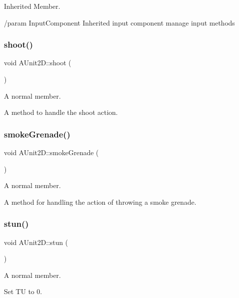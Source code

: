 Inherited Member. 

/param Input\+Component Inherited input component manage input methods \hypertarget{class_a_unit2_d_a6cbf098b221157bb99dc278b3c8dab70}{}\label{class_a_unit2_d_a6cbf098b221157bb99dc278b3c8dab70} 
\subsubsection{\texorpdfstring{shoot()}{shoot()}}
{\footnotesize\ttfamily void A\+Unit2\+D\+::shoot (\begin{DoxyParamCaption}{ }\end{DoxyParamCaption})}



A normal member. 

A method to handle the shoot action. \hypertarget{class_a_unit2_d_ae12beff66c2558df2ca19ae222900988}{}\label{class_a_unit2_d_ae12beff66c2558df2ca19ae222900988} 
\subsubsection{\texorpdfstring{smoke\+Grenade()}{smokeGrenade()}}
{\footnotesize\ttfamily void A\+Unit2\+D\+::smoke\+Grenade (\begin{DoxyParamCaption}{ }\end{DoxyParamCaption})}



A normal member. 

A method for handling the action of throwing a smoke grenade. \hypertarget{class_a_unit2_d_aa98e4af27fd175f81fc9761e4b139caf}{}\label{class_a_unit2_d_aa98e4af27fd175f81fc9761e4b139caf} 
\subsubsection{\texorpdfstring{stun()}{stun()}}
{\footnotesize\ttfamily void A\+Unit2\+D\+::stun (\begin{DoxyParamCaption}{ }\end{DoxyParamCaption})}



A normal member. 

Set TU to 0. \hypertarget{class_a_unit2_d_a383ec068bf651417a27c4e7f9a44ce1c}{}\label{class_a_unit2_d_a383ec068bf651417a27c4e7f9a44ce1c} 
